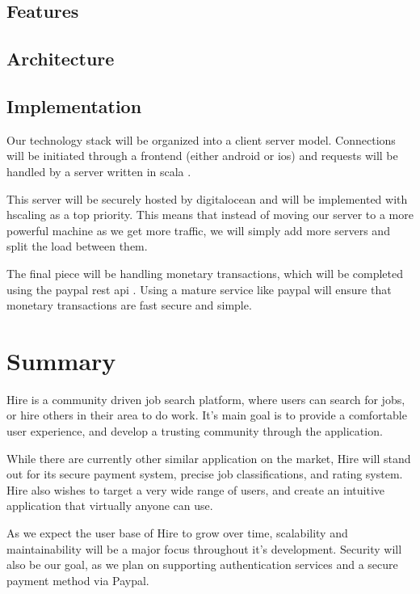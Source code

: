 \documentclass[11pt]{article}
\begin{document}
\subsection{Features}


\subsection{Architecture}


\subsection{Implementation}

Our technology stack will be organized into a \gls{client} \gls{server} model. Connections will be initiated through a \gls{frontend} (either \gls{android} or \gls{ios}) and requests will be handled by a \gls{server} written in \gls{scala} \cite{scala}. 

This \gls{server} will be securely hosted by \gls{digitalocean} and will be implemented with \gls{hscaling} as a top priority. This means that instead of moving our \gls{server} to a more powerful machine as we get more traffic, we will simply add more \glspl{server} and split the load between them.

The final piece will be handling monetary transactions, which will be completed using the \gls{paypal} \gls{rest} \gls{api} \cite{paypal}. Using a mature service like \gls{paypal} will ensure that monetary transactions are fast secure and simple.

%
\section{Summary}
Hire is a community driven job search platform, where users can search for jobs, or hire others in their area to do work. It's main goal is to provide a comfortable user experience, and develop a trusting community through the application.

While there are currently other similar application on the market, Hire will stand out for its secure payment system, precise job classifications, and rating system. Hire also wishes to target a very wide range of users, and create an intuitive application that virtually anyone can use.

As we expect the user base of Hire to grow over time, scalability and maintainability will be a major focus throughout it's development. Security will also be our goal, as we plan on supporting authentication services and a secure payment method via Paypal.
\end{document}
